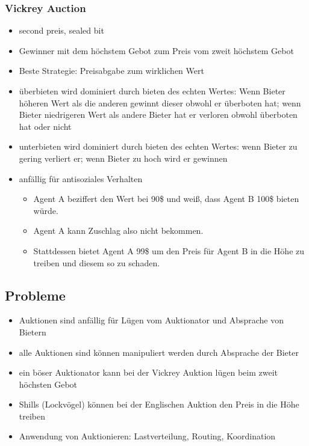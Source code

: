 \begin{multicols}{2}
\subsubsection{Vickrey Auction}
\begin{itemize}
	\item second preis, sealed bit
	\item Gewinner mit dem höchstem Gebot zum Preis vom zweit höchstem Gebot
	\item Beste Strategie: Preisabgabe zum wirklichen Wert
	\item überbieten wird dominiert durch bieten des echten Wertes: Wenn Bieter höheren Wert als die anderen gewinnt dieser obwohl er überboten hat; wenn Bieter niedrigeren Wert als andere Bieter hat er verloren obwohl überboten hat oder nicht
	\item unterbieten wird dominiert durch bieten des echten Wertes: wenn Bieter zu gering verliert er; wenn Bieter zu hoch wird er gewinnen
	\item anfällig für antisoziales Verhalten
	\begin{itemize}
		\item Agent A beziffert den Wert bei 90\$ und weiß, dass Agent B 100\$ bieten würde.
		\item Agent A kann Zuschlag also nicht bekommen.
		\item Stattdessen bietet Agent A 99\$ um den Preis für Agent B in die Höhe zu treiben und diesem so zu schaden.
	\end{itemize}
\end{itemize}
\subsection{Probleme}
\begin{itemize}
	\item Auktionen sind anfällig für Lügen vom Auktionator und Absprache von Bietern
	\item alle Auktionen sind können manipuliert werden durch Absprache der Bieter
	\item ein böser Auktionator kann bei der Vickrey Auktion lügen beim zweit höchsten Gebot
	\item Shills (Lockvögel) können bei der Englischen Auktion den Preis in die Höhe treiben
	\item Anwendung von Auktionieren: Lastverteilung, Routing, Koordination
\end{itemize}
\end{multicols}
